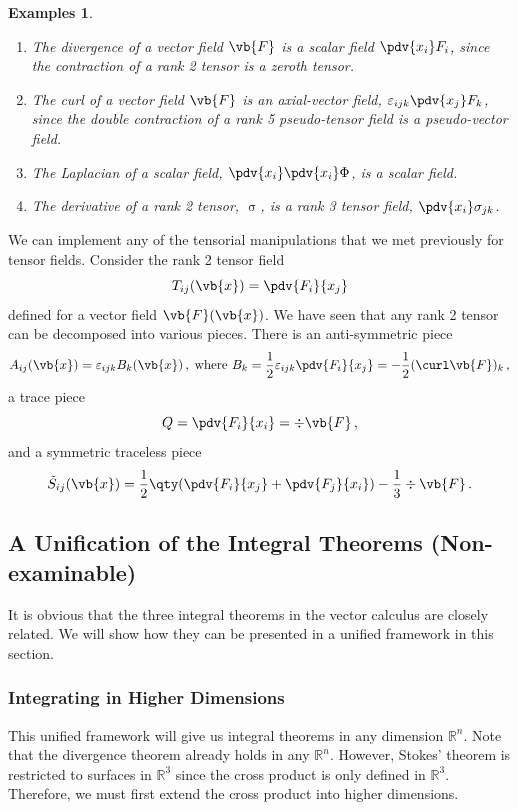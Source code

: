 \documentclass{article}
\theoremstyle{plain}\theoremheaderfont{\normalfont\itshape}\theorembodyfont{\rmfamily}\theoremseparator{.}\newtheorem*{rem}{Remark}\newtheorem*{ex}{Example}\newtheorem*{proof}{Proof}\newtheorem*{altp}{Alternative proof}
\theoremstyle{plain}\theoremheaderfont{\normalfont\bfseries}\theorembodyfont{\rmfamily}\theoremseparator{.}\newtheorem{thm}{Theorem}[section]\newtheorem{lem}[thm]{Lemma}\newtheorem{prop}[thm]{Proposition}\newtheorem*{cor}{Corollary}\newtheorem{defn}[thm]{Definition}\newtheorem{clm}[thm]{Claim}\newtheorem{clminproof}{Claim}
\theoremstyle{break}\theoremheaderfont{\normalfont\itshape}\theorembodyfont{\rmfamily}\theoremseparator{.\medskip}\newtheorem*{proofskip}{Proof}\newtheorem*{exs}{Examples}\newtheorem*{rems}{Remarks}
\theoremstyle{break}\theoremheaderfont{\normalfont\bfseries}\theorembodyfont{\rmfamily}\theoremseparator{.\medskip}\newtheorem{lemskip}[thm]{Lemma}\newtheorem{defnskip}[thm]{Definition}\newtheorem{propskip}[thm]{Proposition}\newtheorem{thmskip}[thm]{Theorem}
\numberwithin{equation}{section}
\begin{document}
	\begin{exs}
		\begin{enumerate}[topsep=0pt,label=(\roman*)]
			\item The divergence of a vector field \(\vb{F}\) is a scalar field \(\pdv{x_i} F_i\), since the contraction of a rank 2 tensor is a zeroth tensor.
			\item The curl of a vector field \(\vb{F}\) is an axial-vector field, \(\varepsilon_{ijk}\pdv{x_j}F_k\), since the double contraction of a rank 5 pseudo-tensor field is a pseudo-vector field.
			\item The Laplacian of a scalar field, \(\pdv{x_i}\pdv{x_i}\Phi\), is a scalar field.
			\item The derivative of a rank 2 tensor, \(\upsigma\), is a rank 3 tensor field, \(\pdv{x_i}\sigma_{jk}\).
		\end{enumerate}
	\end{exs}

	We can implement any of the tensorial manipulations that we met previously for tensor fields. Consider the rank 2 tensor field
	\[T_{ij}(\vb{x})=\pdv{F_i}{x_j}\]
	defined for a vector field \(\vb{F}(\vb{x})\). We have seen that any rank 2 tensor can be decomposed into various pieces.	There is an anti-symmetric piece
	\[A_{ij}(\vb{x})=\varepsilon_{ijk}B_k(\vb{x})\,,\;\text{where }B_k=\frac{1}{2}\varepsilon_{ijk}\pdv{F_i}{x_j}=-\frac{1}{2}(\curl\vb{F})_k\,,\]
	a trace piece
	\[Q=\pdv{F_i}{x_i}=\div\vb{F}\,,\]
	and a symmetric traceless piece
	\[\tilde{S}_{ij}(\vb{x})=\frac{1}{2}\qty(\pdv{F_i}{x_j}+\pdv{F_j}{x_i})-\frac{1}{3}\div\vb{F}\,.\]
	\subsection{A Unification of the Integral Theorems (Non-examinable)}
	It is obvious that the three integral theorems in the vector calculus are closely related. We will show how they can be presented in a unified framework in this section.
	\subsubsection{Integrating in Higher Dimensions}
	This unified framework will give us integral theorems in any dimension \(\mathbb{R}^n\). Note that the divergence theorem already holds in any \(\mathbb{R}^n\). However, Stokes' theorem is restricted to surfaces in \(\mathbb{R}^3\) since the cross product is only defined in \(\mathbb{R}^3\). Therefore, we must first extend the cross product into higher dimensions.
\end{document}
